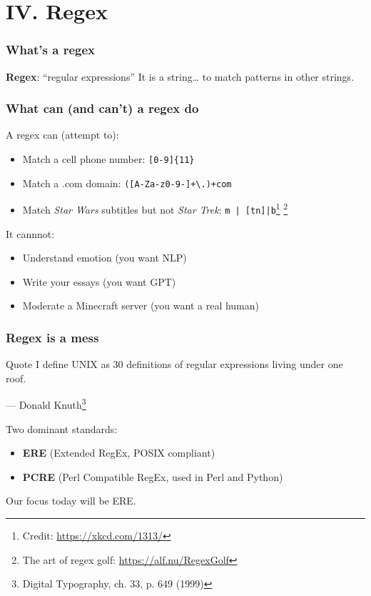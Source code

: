 
\section{IV. Regex}
\begin{frame}
\frametitle{What's a regex}
\textbf{Regex}: ``regular expressions''
\newline \newline
It is a string… to match patterns in other strings.
\end{frame}

\begin{frame}[fragile]
\frametitle{What can (and can't) a regex do}
A regex can (attempt to):
\begin{itemize}
    \item Match a cell phone number: \verb|[0-9]{11}|
    \item Match a .com domain: \verb|([A-Za-z0-9-]+\.)+com|
    \item Match \textit{Star Wars} subtitles but not \textit{Star Trek}:
        \verb!m | [tn]|b!\footnote{Credit: \url{https://xkcd.com/1313/}}
        \footnote{The art of regex golf: \url{https://alf.nu/RegexGolf}}
\end{itemize}
It cannnot:
\begin{itemize}
    \item Understand emotion (you want NLP)
    \item Write your essays (you want GPT)
    \item Moderate a Minecraft server (you want a real human)
\end{itemize}
\end{frame}

\begin{frame}
\frametitle{Regex is a mess}
\begin{block}{Quote}
I define UNIX as 30 definitions of regular expressions living under one roof.
\begin{flushright}
    — Donald Knuth\footnote{Digital Typography, ch. 33, p. 649 (1999)}
\end{flushright}
\end{block}

Two dominant standards:
\begin{itemize}
    \item \textbf{ERE} (Extended RegEx, POSIX compliant)
    \item \textbf{PCRE} (Perl Compatible RegEx, used in Perl and Python)
\end{itemize}
Our focus today will be ERE.
\end{frame}

